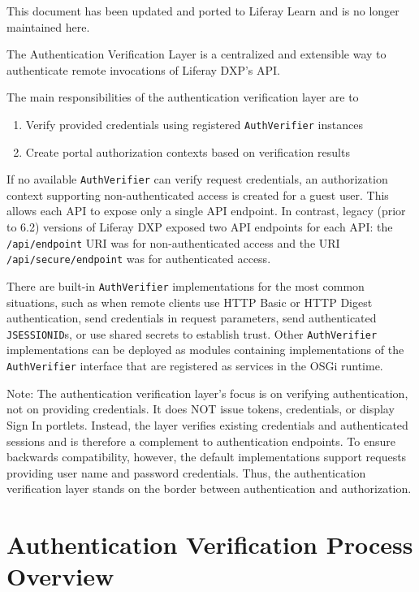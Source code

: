 {This document has been updated and ported to Liferay Learn and is no
longer maintained here.}

The Authentication Verification Layer is a centralized and extensible
way to authenticate remote invocations of Liferay DXP's API.

The main responsibilities of the authentication verification layer are
to

\begin{enumerate}
\def\labelenumi{\arabic{enumi}.}
\item
  Verify provided credentials using registered \texttt{AuthVerifier}
  instances
\item
  Create portal authorization contexts based on verification results
\end{enumerate}

If no available \texttt{AuthVerifier} can verify request credentials, an
authorization context supporting non-authenticated access is created for
a guest user. This allows each API to expose only a single API endpoint.
In contrast, legacy (prior to 6.2) versions of Liferay DXP exposed two
API endpoints for each API: the \texttt{/api/endpoint} URI was for
non-authenticated access and the URI \texttt{/api/secure/endpoint} was
for authenticated access.

There are built-in \texttt{AuthVerifier} implementations for the most
common situations, such as when remote clients use HTTP Basic or HTTP
Digest authentication, send credentials in request parameters, send
authenticated \texttt{JSESSIONID}s, or use shared secrets to establish
trust. Other \texttt{AuthVerifier} implementations can be deployed as
modules containing implementations of the \texttt{AuthVerifier}
interface that are registered as services in the OSGi runtime.

Note: The authentication verification layer's focus is on verifying
authentication, not on providing credentials. It does NOT issue tokens,
credentials, or display Sign In portlets. Instead, the layer verifies
existing credentials and authenticated sessions and is therefore a
complement to authentication endpoints. To ensure backwards
compatibility, however, the default implementations support requests
providing user name and password credentials. Thus, the authentication
verification layer stands on the border between authentication and
authorization.

\section{Authentication Verification Process
Overview}\label{authentication-verification-process-overview}

